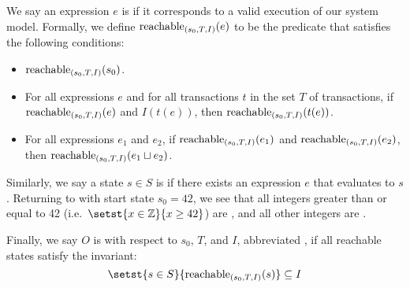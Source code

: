 We say an expression $e$ is  if it corresponds to a
valid execution of our system model. Formally, we define
$\text{reachable}_{(s_0, T, I)}(e)$ to be the predicate that satisfies the
following conditions:
\begin{itemize}
  \item
    $\text{reachable}_{(s_0, T, I)}(s_0)$.
  \item
    For all expressions $e$ and for all transactions $t$ in the set $T$ of
    transactions, if $\text{reachable}_{(s_0, T, I)}(e)$ and $I(t(e))$, then
    $\text{reachable}_{(s_0, T, I)}(t(e))$.
  \item
    For all expressions $e_1$ and $e_2$, if $\text{reachable}_{(s_0, T, I)}(e_1)$ and
    $\text{reachable}_{(s_0, T, I)}(e_2)$, then $\text{reachable}_{(s_0, T, I)}(e_1 \sqcup
    e_2)$.
\end{itemize}
Similarly, we say a state $s \in S$ is \sTIreachable{} if there exists an
\sTIreachable{} expression $e$ that evaluates to $s$. Returning to
 with start state $s_0 = 42$, we see that all integers greater
than or equal to 42 (i.e.\ $\setst{x \in \ints}{x \geq 42}$) are
\sTIreachable{}, and all other integers are \sTIunreachable{}.

Finally, we say $O$ is  with respect to $s_0$,
$T$, and $I$, abbreviated , if all reachable states
satisfy the invariant:
\[
  \setst{s \in S}{\sTIreachablepredicate{s}} \subseteq I
\]
